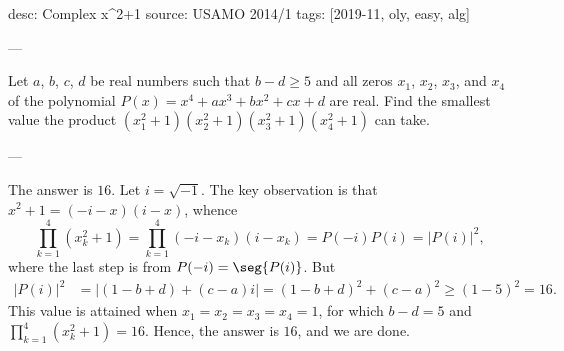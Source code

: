 desc: Complex x^2+1
source: USAMO 2014/1
tags: [2019-11, oly, easy, alg]

---

Let $a$, $b$, $c$, $d$ be real numbers such that $b-d\ge5$ and all zeros $x_1$, $x_2$, $x_3$, and $x_4$ of the polynomial $P(x)=x^4+ax^3+bx^2+cx+d$ are real. Find the smallest value the product $(x_1^2+1)(x_2^2+1)(x_3^2+1)(x_4^2+1)$ can take.

---

The answer is $16$. Let $i=\sqrt{-1}$. The key observation is that $x^2+1=(-i-x)(i-x)$, whence \[\prod_{k=1}^4\left(x_k^2+1\right)=\prod_{k=1}^4(-i-x_k)(i-x_k)=P(-i)P(i)=|P(i)|^2,\]
where the last step is from $P(-i)=\seg{P(i)}$. But
\begin{align*}
|P(i)|^2&=|(1-b+d)+(c-a)i|=(1-b+d)^2+(c-a)^2\ge(1-5)^2=16.
\end{align*}
This value is attained when $x_1=x_2=x_3=x_4=1$, for which $b-d=5$ and $\prod_{k=1}^4\left(x_k^2+1\right)=16$. Hence, the answer is $16$, and we are done.
